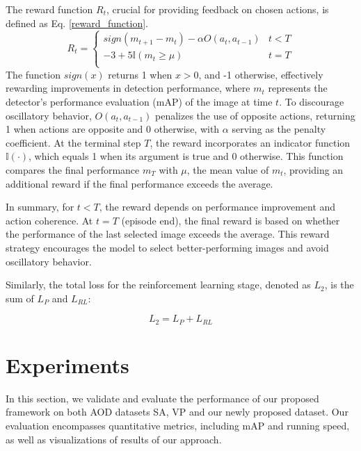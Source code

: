 \documentclass[lettersize,journal]{IEEEtran}
\begin{document}
The reward function $R_t$, crucial for providing feedback on chosen actions, is defined as Eq. \ref{reward_function}.
\begin{equation}
    R_t=\begin{cases}
        sign\left( m_{t+1}-m_t \right) -\alpha O\left( a_t,a_{t-1} \right)&		t<T\\
        -3+5\mathbb{I}\left( m_t\geq \mu \right)&		t=T\\
    \end{cases}
    \label{reward_function}
\end{equation}
The function $sign(x)$ returns 1 when $x > 0$, and -1 otherwise, effectively rewarding improvements in detection performance, where $m_t$ represents the detector's performance evaluation (mAP) of the image at time $t$.
To discourage oscillatory behavior, $O(a_t,a_{t-1})$ penalizes the use of opposite actions, returning 1 when actions are opposite and 0 otherwise, with $\alpha$ serving as the penalty coefficient.
At the terminal step $T$, the reward incorporates an indicator function $\mathbb{I}(\cdot)$, which equals 1 when its argument is true and 0 otherwise.
This function compares the final performance $m_T$ with $\mu$, the mean value of $m_t$, providing an additional reward if the final performance exceeds the average.

In summary, for $t < T$, the reward depends on performance improvement and action coherence.
At $t = T$ (episode end), the final reward is based on whether the performance of the last selected image exceeds the average.
This reward strategy encourages the model to select better-performing images and avoid oscillatory behavior.

Similarly, the total loss for the reinforcement learning stage, denoted as \( L_2 \), is the sum of \( L_P \) and \( L_{RL} \):

\begin{equation}
L_2 = L_P + L_{RL}
\end{equation}






\section{Experiments}
In this section, we validate and evaluate the performance of our proposed framework on both AOD datasets SA, VP \cite{dynamic2021} and our newly proposed dataset. Our evaluation encompasses quantitative metrics, including mAP and running speed, as well as visualizations of results of our approach.
\end{document}
